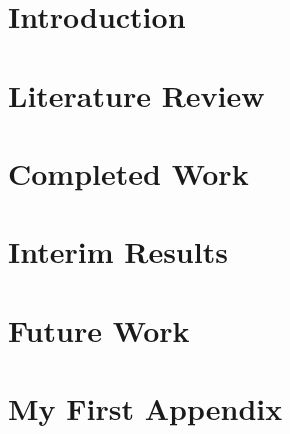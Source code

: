 \documentclass[a4paper,11pt,twoside]{report}
\author{\me}
\begin{document}


\normalsize

%
\begingroup
    \singlespacing
    \tableofcontents
\endgroup

\linespread{2}
\chapter{Introduction}\label{chapter:Introduction}
\setcounter{page}{0}


\chapter{Literature Review}\label{chapter:Literature Review}


\begingroup
\renewcommand{\cleardoublepage}{}
\renewcommand{\clearpage}{}
\vspace{33pt}
\chapter{Completed Work}\label{chapter:Completed Work}
\endgroup


\chapter{Interim Results}\label{chapter:Interim Results}


\chapter{Future Work}\label{chapter:Future Work}


%



\newpage

\appendix
\chapter{My First Appendix}\label{chapter:Appendix A}

\end{document}

